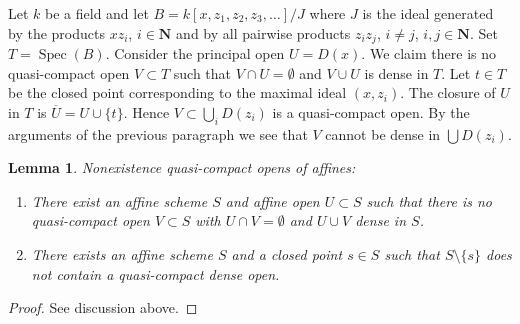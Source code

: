 \documentclass[10pt,a4paper]{amsart}
\theoremstyle{plain}
\newtheorem{lemma}[subsection]{Lemma}
\theoremstyle{definition}
\theoremstyle{remark}
\numberwithin{equation}{subsection}
\def\Spec{\mathop{\mathrm{Spec}}}
\begin{document}
\medskip\noindent
Let $k$ be a field and let $B = k[x, z_1, z_2, z_3, \ldots]/J$ where $J$
is the ideal generated by the products $xz_i$, $i \in \mathbf{N}$ and by
all pairwise products $z_iz_j$, $i \not = j$, $i, j \in \mathbf{N}$.
Set $T = \Spec(B)$. Consider the principal open $U = D(x)$.
We claim there is no quasi-compact open $V \subset T$ such that
$V \cap U = \emptyset$ and $V \cup U$ is dense in $T$.
Let $t \in T$ be the closed point corresponding to the maximal
ideal $(x, z_i)$. The closure of $U$ in $T$ is
$\overline{U} = U \cup \{t\}$. Hence $V \subset \bigcup_i D(z_i)$
is a quasi-compact open. By the arguments of the previous paragraph
we see that $V$ cannot be dense in $\bigcup D(z_i)$.

\begin{lemma}
\label{lemma-complement-of-affine-does-not-contain-qc-dense-open}
Nonexistence quasi-compact opens of affines:
\begin{enumerate}
\item There exist an affine scheme $S$ and affine open $U \subset S$
such that there is no quasi-compact open $V \subset S$ with
$U \cap V = \emptyset$ and $U \cup V$ dense in $S$.
\item There exists an affine scheme $S$ and a closed point $s \in S$ such that
$S \setminus \{s\}$ does not contain a quasi-compact dense open.
\end{enumerate}
\end{lemma}

\begin{proof}
See discussion above.
\end{proof}
\end{document}
